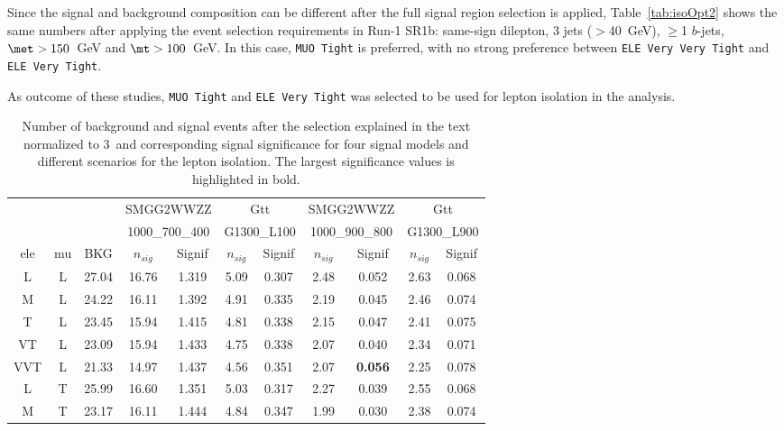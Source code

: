 Since the signal and background composition can be different after the full signal region selection is applied, 
Table~\ref{tab:isoOpt2} shows the same numbers after applying the event selection requirements in Run-1 SR1b: 
same-sign dilepton, 3 jets (\pt$>$40~GeV), $\geq$1 $b$-jets, 
$\met >150$~GeV and $\mt >100$~GeV. In this case, {\tt MUO Tight} is preferred, with no strong preference between 
{\tt ELE Very Very Tight} and {\tt ELE Very Tight}.

As outcome of these studies, {\tt MUO Tight} and {\tt ELE Very Tight} was selected to be used for lepton isolation in the analysis.


\begin{table}[htb]
\caption{Number of background and signal events after the selection explained in the text normalized to 3\ifb\ and 
corresponding signal significance for four
signal models and different scenarios for the lepton isolation. The largest significance values is highlighted in bold.}
\label{tab:isoOpt1}
\begin{center}
\begin{tabular}{|cc|c|cc|cc|cc|cc|}
\hline
  &  &  & \multicolumn{2}{c|}{SMGG2WWZZ}  & \multicolumn{2}{c|}{Gtt}  & \multicolumn{2}{c|}{SMGG2WWZZ} & \multicolumn{2}{c|}{Gtt} \\ 
  &  &   & \multicolumn{2}{c|}{1000\_700\_400}  & \multicolumn{2}{c|}{G1300\_L100}  & \multicolumn{2}{c|}{1000\_900\_800} & \multicolumn{2}{c|}{G1300\_L900} \\ \hline
ele  & mu & BKG & $n_{sig}$ & Signif & $n_{sig}$ & Signif & $n_{sig}$ & Signif & $n_{sig}$ & Signif \\ \hline
L  & L & 27.04 & 16.76 & 1.319 & 5.09 & 0.307  & 2.48 & 0.052 & 2.63 & 0.068  \\  
M  & L & 24.22 & 16.11 & 1.392 & 4.91 & 0.335  & 2.19 & 0.045 & 2.46 & 0.074  \\  
T  & L & 23.45 & 15.94 & 1.415 & 4.81 & 0.338  & 2.15 & 0.047 & 2.41 & 0.075  \\  
VT & L & 23.09 & 15.94 & 1.433 & 4.75 & 0.338  & 2.07 & 0.040 & 2.34 & 0.071  \\  
VVT& L & 21.33 & 14.97 & 1.437 & 4.56 & 0.351  & 2.07 & \textbf{0.056} & 2.25 & 0.078  \\  \hline
L  & T & 25.99 & 16.60 & 1.351 & 5.03 & 0.317  & 2.27 & 0.039 & 2.55 & 0.068  \\  
M  & T & 23.17 & 16.11 & 1.444 & 4.84 & 0.347  & 1.99 & 0.030 & 2.38 & 0.074  \\  

\end{tabular}
\end{center}
\end{table}
